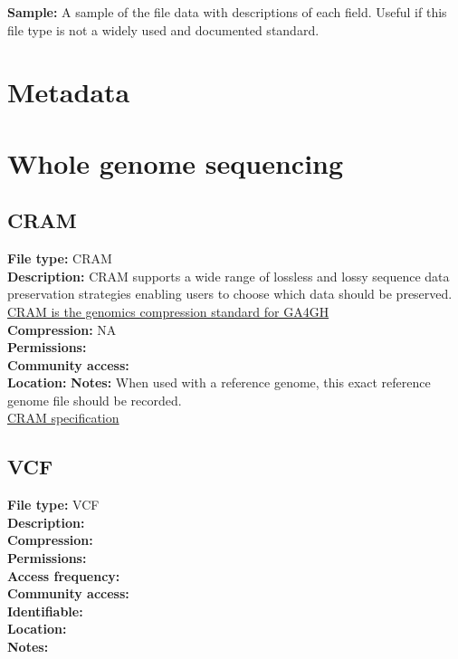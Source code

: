 \documentclass[
]{book}
\begin{document}
\textbf{Sample:} A sample of the file data with descriptions of each field. Useful if this file type is not a widely used and documented standard.

\hypertarget{metadata}{%
\chapter{Metadata}\label{metadata}}

\hypertarget{whole-genome-sequencing}{%
\chapter{Whole genome sequencing}\label{whole-genome-sequencing}}

\hypertarget{cram}{%
\section{CRAM}\label{cram}}

\textbf{File type:} CRAM\\
\textbf{Description:} CRAM supports a wide
range of lossless and lossy sequence data preservation strategies enabling users to choose which data should be preserved. \href{https://www.ga4gh.org/cram/}{CRAM is the genomics compression standard for GA4GH}\\
\textbf{Compression:} NA\\
\textbf{Permissions:}\\
\textbf{Community access:}\\
\textbf{Location:}
\textbf{Notes:} When used with a reference genome, this exact reference genome file should be recorded.\\
\href{https://samtools.github.io/hts-specs/CRAMv3.pdf}{CRAM specification}

\hypertarget{vcf}{%
\section{VCF}\label{vcf}}

\textbf{File type:} VCF\\
\textbf{Description:}\\
\textbf{Compression:}\\
\textbf{Permissions:}\\
\textbf{Access frequency:}\\
\textbf{Community access:}\\
\textbf{Identifiable:}\\
\textbf{Location:}\\
\textbf{Notes:}
\end{document}
